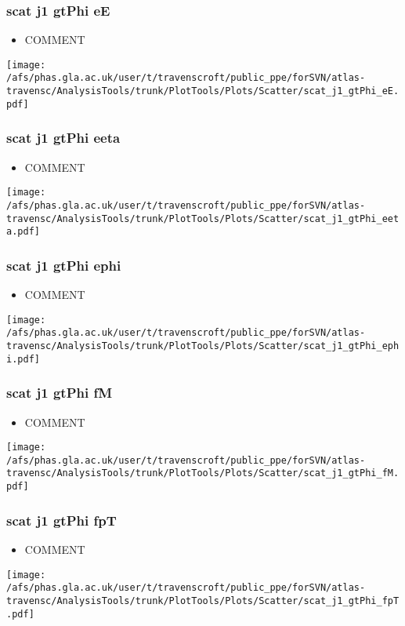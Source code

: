 \documentclass{beamer}
\begin{document}
\begin{frame}
\frametitle{scat j1 gtPhi eE}
\begin{itemize}
\item COMMENT
\end{itemize}
\begin{center}
\texttt{[image: /afs/phas.gla.ac.uk/user/t/travenscroft/public\_ppe/forSVN/atlas-travensc/AnalysisTools/trunk/PlotTools/Plots/Scatter/scat\_j1\_gtPhi\_eE.pdf]}
\end{center}
\end{frame}

\begin{frame}
\frametitle{scat j1 gtPhi eeta}
\begin{itemize}
\item COMMENT
\end{itemize}
\begin{center}
\texttt{[image: /afs/phas.gla.ac.uk/user/t/travenscroft/public\_ppe/forSVN/atlas-travensc/AnalysisTools/trunk/PlotTools/Plots/Scatter/scat\_j1\_gtPhi\_eeta.pdf]}
\end{center}
\end{frame}

\begin{frame}
\frametitle{scat j1 gtPhi ephi}
\begin{itemize}
\item COMMENT
\end{itemize}
\begin{center}
\texttt{[image: /afs/phas.gla.ac.uk/user/t/travenscroft/public\_ppe/forSVN/atlas-travensc/AnalysisTools/trunk/PlotTools/Plots/Scatter/scat\_j1\_gtPhi\_ephi.pdf]}
\end{center}
\end{frame}

\begin{frame}
\frametitle{scat j1 gtPhi fM}
\begin{itemize}
\item COMMENT
\end{itemize}
\begin{center}
\texttt{[image: /afs/phas.gla.ac.uk/user/t/travenscroft/public\_ppe/forSVN/atlas-travensc/AnalysisTools/trunk/PlotTools/Plots/Scatter/scat\_j1\_gtPhi\_fM.pdf]}
\end{center}
\end{frame}

\begin{frame}
\frametitle{scat j1 gtPhi fpT}
\begin{itemize}
\item COMMENT
\end{itemize}
\begin{center}
\texttt{[image: /afs/phas.gla.ac.uk/user/t/travenscroft/public\_ppe/forSVN/atlas-travensc/AnalysisTools/trunk/PlotTools/Plots/Scatter/scat\_j1\_gtPhi\_fpT.pdf]}
\end{center}
\end{frame}
\end{document}
